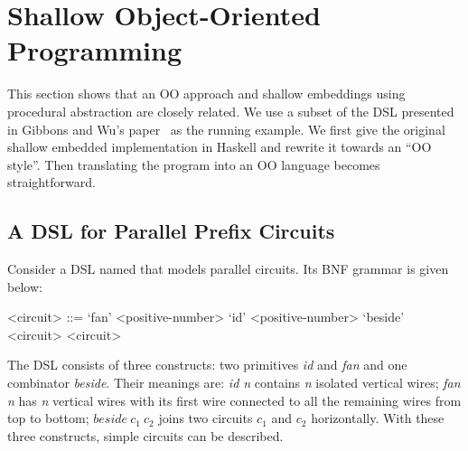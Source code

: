 \section{Shallow Object-Oriented Programming}\label{sec:oo}

\begin{comment}
Weixin writes this part.

Argue that shallow embeddings and straightforward OO 
programs are essentially the same thing. 

Start from a simple shallow DSL in Haskell, 
and iterate throught it until you reach a form 
that looks like an OO program.

Show how todo transformations in Shallow embeddings
using the insight of how to do transformations in OO
programs.

Show the correponding Java programs and the Java program 
with transformation that we can port back to Haskell.
\end{comment}

This section shows that an OO approach and shallow embeddings using
procedural abstraction are closely related.  We use a subset of the
DSL presented in Gibbons and Wu's paper~\cite{gibbons2014folding} as
the running example.  We first give the original shallow embedded
implementation in Haskell and rewrite it towards an ``OO style''.
Then translating the program into an OO language becomes straightforward.

\subsection{A DSL for Parallel Prefix Circuits}
Consider a DSL named \dsl that models parallel circuits.
Its BNF grammar is given below:
\setlength{\grammarindent}{5em} %

\begin{grammar}
<circuit> ::= `fan' <positive-number>
\alt `id' <positive-number>
\alt `beside' <circuit> <circuit>
\end{grammar}

\noindent The DSL consists of three constructs: two primitives
\emph{id} and \emph{fan} and one combinator \emph{beside}.
Their meanings are: \emph{id n} contains \emph{n} isolated vertical wires;
\emph{fan n} has \emph{n} vertical wires with its first wire connected to
all the remaining wires from top to bottom; $beside\ c_1\ c_2$ joins two circuits
$c_1$ and $c_2$ horizontally.
With these three constructs, simple circuits can be described.

